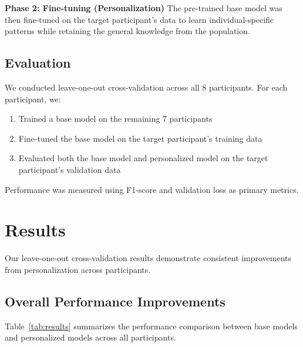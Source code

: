 \documentclass[11pt]{article}
\begin{document}
\textbf{Phase 2: Fine-tuning (Personalization)}
The pre-trained base model was then fine-tuned on the target participant's data to learn individual-specific patterns while retaining the general knowledge from the population.

\subsection{Evaluation}

We conducted leave-one-out cross-validation across all 8 participants. For each participant, we:
\begin{enumerate}
    \item Trained a base model on the remaining 7 participants
    \item Fine-tuned the base model on the target participant's training data
    \item Evaluated both the base model and personalized model on the target participant's validation data
\end{enumerate}

Performance was measured using F1-score and validation loss as primary metrics.

\section{Results}
\label{sec:results}


Our leave-one-out cross-validation results demonstrate consistent improvements from personalization across participants.

\subsection{Overall Performance Improvements}

Table~\ref{tab:results} summarizes the performance comparison between base models and personalized models across all participants.
\end{document}
